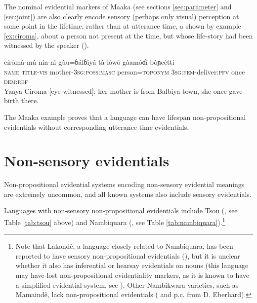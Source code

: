 \documentclass[oneside,a4paper,11pt]{article}
\newcommand{\ipa}[1]{{\phon \mbox{#1}}} %
\begin{document}
The nominal evidential markers of Maaka (see sections \ref{sec:parameter} and \ref{sec:joint}) are also clearly encode sensory (perhaps only visual) perception at some point in the lifetime, rather than at utterance time, a shown by example \ref{ex:ciroma}, about a person not present at the time, but whose life-story had been witnessed by the speaker (\citealt[196]{storch14maaka}).

\begin{exe}
\ex \label{ex:ciroma}
\gll \ipa{yáayà} \ipa{círòmà-mú} \ipa{nín-nì} \ipa{gùu=ɓálɓìyá} \ipa{tà-lòwó} \ipa{gàamôɗí} \ipa{bòɲcéttí} \\
\textsc{name} \textsc{title-vis} mother-\textsc{3sg:poss:masc} person=\textsc{toponym} \textsc{3sg:fem}-deliver:\textsc{pfv} once \textsc{dem:ref} \\
\glt Yaaya Ciroma [eye-witnessed]: her mother is from Balbiya town, she once gave birth there.
\end{exe}

 The Maaka example proves that a language can have lifespan non-propositional evidentials without corresponding utterance time evidentials.
  
\section{Non-sensory evidentials} \label{sec:nonsens}
Non-propositional evidential systems encoding non-sensory evidential meanings are extremely uncommon, and all known systems also include sensory evidentials.

Languages with non-sensory non-propositional evidentials include Tsou (\citealt{yang00tsou.case}, see Table \ref{tab:tsou} above) and Nambiquara (\citealt{lowe99nambiquara}, see Table \ref{tab:nambiquara}).\footnote{Note that Lakondê, a language closely related to Nambiquara, has been reported to have sensory non-propositional evidentials (\citealt[248-9]{wetzels06lakonde}), but it is unclear whether it also has inferential or hearsay evidentials on nouns (this language may have lost non-propositional evidentiality markers, as it is known to have a simplified evidential system, see \citet[274-5]{aikhenvald12amazon}). Other Nambikwara varieties, such as Mamaindê, lack non-propositional evidentials (\citealt{eberhard09nambikwara} and p.c. from D. Eberhard).}  
\end{document}
